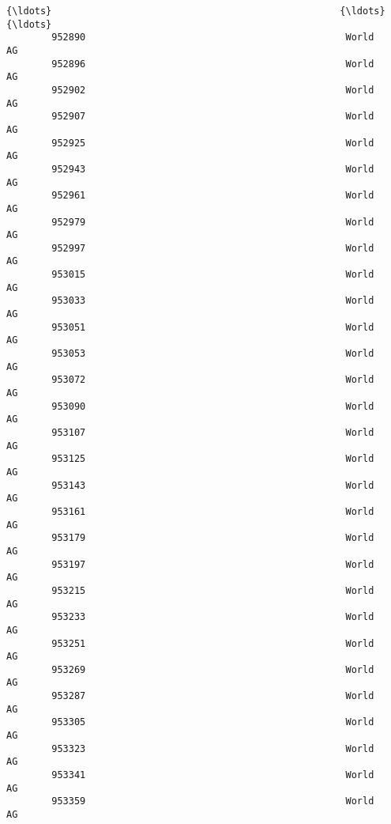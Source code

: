 \documentclass[11pt]{article}
\begin{document}
\begin{Verbatim}[commandchars=\\\{\}]
        {\ldots}                                                   {\ldots}            {\ldots}   
        952890                                              World       AG         
        952896                                              World       AG         
        952902                                              World       AG         
        952907                                              World       AG         
        952925                                              World       AG         
        952943                                              World       AG         
        952961                                              World       AG         
        952979                                              World       AG         
        952997                                              World       AG         
        953015                                              World       AG         
        953033                                              World       AG         
        953051                                              World       AG         
        953053                                              World       AG         
        953072                                              World       AG         
        953090                                              World       AG         
        953107                                              World       AG         
        953125                                              World       AG         
        953143                                              World       AG         
        953161                                              World       AG         
        953179                                              World       AG         
        953197                                              World       AG         
        953215                                              World       AG         
        953233                                              World       AG         
        953251                                              World       AG         
        953269                                              World       AG         
        953287                                              World       AG         
        953305                                              World       AG         
        953323                                              World       AG         
        953341                                              World       AG         
        953359                                              World       AG         
        

\end{Verbatim}
\end{document}

